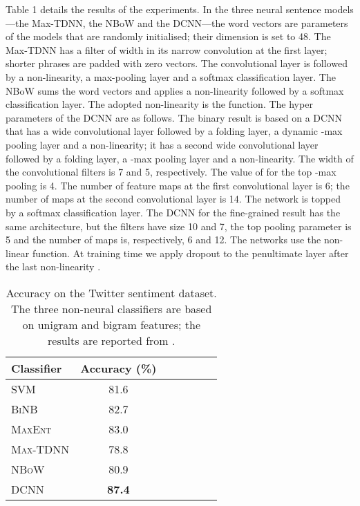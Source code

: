 \documentclass[11pt]{article}
\begin{document}
Table 1 details the results of the experiments. In the three neural sentence models---the Max-TDNN, the NBoW and the DCNN---the word vectors are parameters of the models that are randomly initialised; their dimension  is set to 48. The Max-TDNN has a filter of width  in its narrow convolution at the first layer; shorter phrases are padded with zero vectors. The convolutional layer is followed by a non-linearity, a max-pooling layer and a softmax classification layer. The NBoW sums the word vectors and applies a non-linearity followed by a softmax classification layer.  The adopted non-linearity is the  function.
The hyper parameters of the DCNN are as follows. The binary result is based on a DCNN that has a wide convolutional layer followed by a folding layer, a dynamic -max pooling layer and a non-linearity; it has a second wide convolutional layer followed by a folding layer, a -max pooling layer and a non-linearity.  The width of the convolutional filters is 7 and 5, respectively. The value of  for the top -max pooling is 4. The number of feature maps at the first convolutional layer is 6; the number of maps at the second convolutional layer is 14. The network is topped by a softmax classification layer. The DCNN for the fine-grained result has  the same architecture, but the filters have size 10 and 7, the top pooling parameter  is 5 and the number of maps is, respectively, 6 and 12. The networks use the  non-linear function. At training time we apply dropout to the penultimate layer after the last  non-linearity \cite{DBLP:journals/corr/abs-1207-0580}. 
\begin{table}
\label{sec:twitter}
\centering
\small
\begin{tabular}{ l  c  c  c  c  c c  } 
\toprule
 Classifier & Accuracy (\%) \\
\midrule
\textsc{SVM}  & 81.6 \\ \midrule
\textsc{BiNB}  & 82.7  \\ \midrule
\textsc{MaxEnt} & 83.0 \\ \midrule
\textsc{Max-TDNN} & {78.8} \\ \midrule
\textsc{NBoW} & {80.9} \\ \midrule
\textsc{DCNN} & \textbf{87.4} \\ \midrule
\bottomrule
\end{tabular}
\vspace{-0.1cm}
\caption{Accuracy on the Twitter sentiment dataset. The three non-neural classifiers are based on unigram and bigram features; the results are reported from \cite{Go_Bhayani_Huang_2009}. }
\vspace{-0.5cm}
\end{table}
\end{document}

